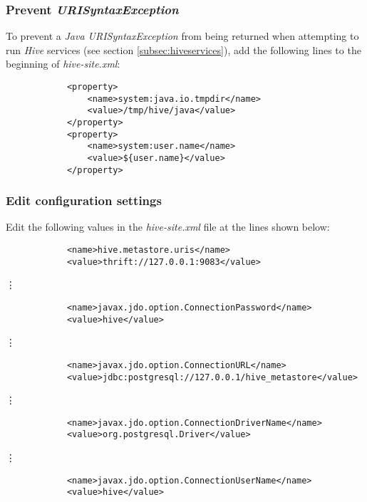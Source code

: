 \documentclass{article}
\begin{document}
        \subsubsection{Prevent \emph{URISyntaxException}}
        To prevent a \emph{Java URISyntaxException} from being returned when attempting to run \emph{Hive}
        services (see section \ref{subsec:hiveservices}), add the following lines to the beginning of
        \emph{hive-site.xml}:
        \begin{verbatim}
            <property>
                <name>system:java.io.tmpdir</name>
                <value>/tmp/hive/java</value>
            </property>
            <property>
                <name>system:user.name</name>
                <value>${user.name}</value>
            </property>
        \end{verbatim}

        \subsubsection{Edit configuration settings}
        Edit the following values in the \emph{hive-site.xml} file at the lines shown below:
        \begin{verbatim}
            <name>hive.metastore.uris</name>
            <value>thrift://127.0.0.1:9083</value>
        \end{verbatim}
        \centerline{\vdots}
        \begin{verbatim}
            <name>javax.jdo.option.ConnectionPassword</name>
            <value>hive</value>
        \end{verbatim}
        \centerline{\vdots}
        \begin{verbatim}
            <name>javax.jdo.option.ConnectionURL</name>
            <value>jdbc:postgresql://127.0.0.1/hive_metastore</value>
        \end{verbatim}
        \centerline{\vdots}
        \begin{verbatim}
            <name>javax.jdo.option.ConnectionDriverName</name>
            <value>org.postgresql.Driver</value>
        \end{verbatim}
        \centerline{\vdots}
        \begin{verbatim}
            <name>javax.jdo.option.ConnectionUserName</name>
            <value>hive</value>
        \end{verbatim}
\end{document}

